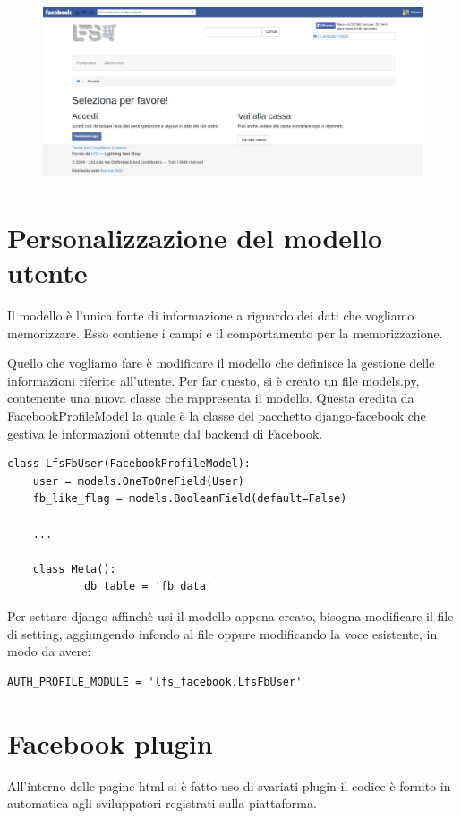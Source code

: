 \begin{figure}
\includegraphics[width=0.9\columnwidth]{img/checkout}
\end{figure}

\section{Personalizzazione del modello utente}
Il modello è l'unica fonte di informazione a riguardo dei dati che vogliamo memorizzare. Esso contiene i campi e il comportamento per la memorizzazione. 

Quello che vogliamo fare è modificare il modello che definisce la gestione delle informazioni riferite all'utente. Per far questo, si è creato un file models.py, contenente una nuova classe che rappresenta il modello. Questa eredita da FacebookProfileModel la quale è la classe del pacchetto django-facebook che gestiva le informazioni ottenute dal backend di Facebook.

\begin{lstlisting}
class LfsFbUser(FacebookProfileModel):
    user = models.OneToOneField(User)
    fb_like_flag = models.BooleanField(default=False)
	
	...	
	
    class Meta():
            db_table = 'fb_data'
\end{lstlisting}

Per settare django affinchè usi il modello appena creato, bisogna modificare il file di setting, aggiungendo infondo al file oppure modificando la voce esistente, in modo da avere:

\begin{lstlisting}
AUTH_PROFILE_MODULE = 'lfs_facebook.LfsFbUser'
\end{lstlisting}


\section{Facebook plugin}
All'interno delle pagine html si è fatto uso di svariati plugin il codice è fornito in automatica agli sviluppatori registrati sulla piattaforma.

